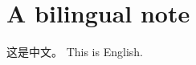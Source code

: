 \documentclass[11pt]{article}
\begin{document}
\section{A bilingual note}这是中文。 This is English.
\end{document}
